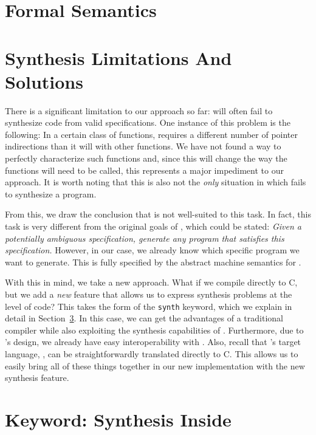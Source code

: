 \documentclass[acmsmall]{acmart}
\begin{document}
\section{Formal Semantics}
\label{sec:semantics}

\section{Synthesis Limitations And Solutions}
\label{sec:limitations}

There is a significant limitation to our approach so far: \SuSLik will often fail to synthesize code from valid specifications. One instance of this problem is the following: In a certain class of functions, \SuSLik{} requires a different number of pointer indirections than it will with other functions. We have not found a way to perfectly characterize such functions and, since this will change the way the functions will need to be called, this represents a major impediment to our approach. It is worth noting that this is also not the \textit{only} situation in which \SuSLik{} fails to synthesize a program.

From this, we draw the conclusion that \SuSLik{} is not well-suited to this task. In fact, this task is very different from the original goals of \SuSLik, which could be stated: \textit{Given a potentially ambiguous specification, generate any program that satisfies this specification.} However, in our case, we already know which specific program we want to generate. This is fully specified by the abstract machine semantics for \Pika.

With this in mind, we take a new approach. What if we compile \Pika{} directly to C, but we add a \textit{new} feature that allows us to express synthesis problems at the level of \Pika{} code? This takes the form of the \verb|synth| keyword, which we explain in detail in Section~\ref{sec:synth}. In this case, we can get the advantages of a traditional compiler while also exploiting the synthesis capabilities of \SuSLik. Furthermore, due to \Pika's design, we already have easy interoperability with \SuSLik. Also, recall that \SuSLik's target language, \SuSLang, can be straightforwardly translated directly to C. This allows us to easily bring all of these things together in our new implementation with the new \Pika{} synthesis feature.

\section{\synth{} Keyword: Synthesis Inside \Pika}
\label{sec:synth}
\end{document}
